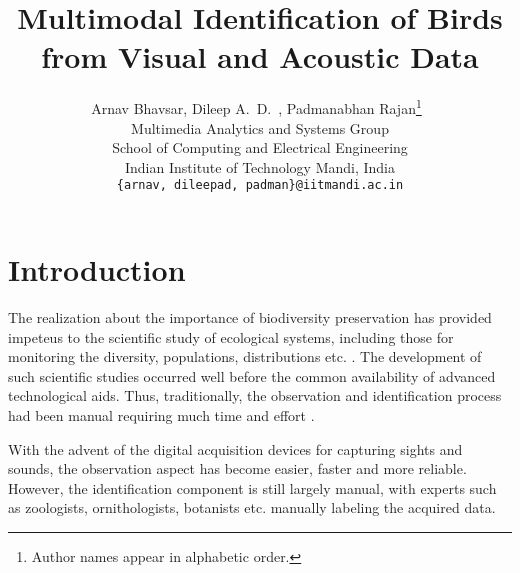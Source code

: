 \documentclass{article}
\begin{document}
\title{Multimodal Identification of Birds from Visual and Acoustic Data}
\author{Arnav Bhavsar, Dileep A.~D.~, Padmanabhan Rajan\footnote{Author names
appear in alphabetic order.}\  \\Multimedia Analytics and Systems Group \\ 
School of Computing and Electrical Engineering\\
Indian Institute of Technology Mandi, India\\
\texttt{\{arnav, dileepad, padman\}@iitmandi.ac.in}}

\date{}
\maketitle

\section{Introduction}






The realization about the importance of biodiversity preservation has provided impeteus to the scientific study of ecological systems, including those for monitoring the diversity, populations, distributions etc. \cite{}. %
The development of such scientific studies occurred well before the common availability of advanced technological aids. Thus, traditionally, the observation and identification process had been manual requiring much time and effort \cite{}. 

With the advent of the digital acquisition devices for capturing sights and sounds, the observation aspect has become easier, faster and more reliable. However, the identification component is still largely manual, with experts such as zoologists, ornithologists, botanists etc. manually labeling the acquired data. 
\end{document}
